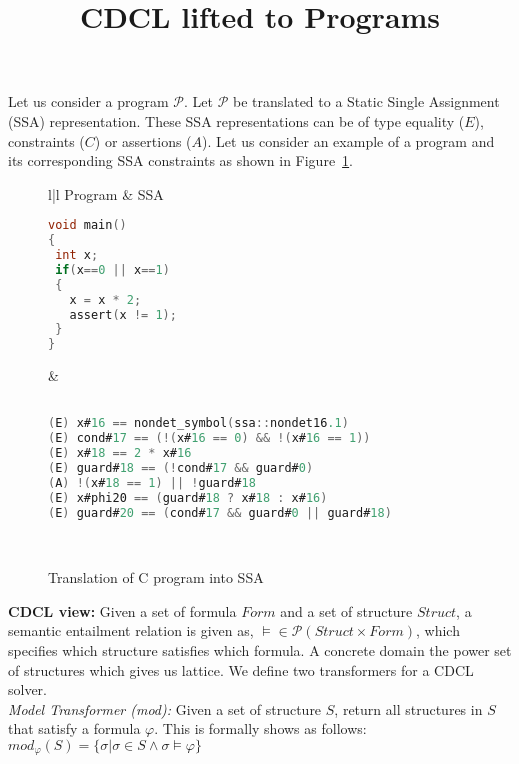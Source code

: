 \documentclass{article}
\begin{document}
\title{CDCL lifted to Programs}
\vspace{0.3cm}
\date{}
\maketitle
{}

\maketitle
Let us consider a program $\mathcal{P}$. Let $\mathcal{P}$ be translated 
to a Static Single Assignment (SSA) representation. These SSA representations 
can be of type equality ($E$), constraints ($C$) or assertions ($A$). 
Let us consider an example of a program and its corresponding SSA constraints as
shown in Figure~\ref{figure:ssa}. 

\begin{figure}[htbp]
\begin{tabular}{l|l}
\hline
Program & SSA \\
\hline
\begin{lstlisting}[mathescape=true,language=C]
void main()
{
 int x;
 if(x==0 || x==1)
 {
   x = x * 2; 
   assert(x != 1);
 }
}
\end{lstlisting}
&
\begin{lstlisting}[mathescape=true,language=C]

(E) x#16 == nondet_symbol(ssa::nondet16.1)
(E) cond#17 == (!(x#16 == 0) && !(x#16 == 1))
(E) x#18 == 2 * x#16
(E) guard#18 == (!cond#17 && guard#0)
(A) !(x#18 == 1) || !guard#18
(E) x#phi20 == (guard#18 ? x#18 : x#16)
(E) guard#20 == (cond#17 && guard#0 || guard#18)
\end{lstlisting}
\\
\hline
\end{tabular}
\caption{Translation of C program into SSA}
\label{figure:ssa}
\end{figure}

\textbf{CDCL view:}
Given a set of formula $Form$ and a set of structure $Struct$, 
a semantic entailment relation is given as, $\models \in \mathcal{P}(Struct
\times Form)$, which specifies which structure satisfies which formula. A 
concrete domain the power set of structures which gives us lattice. 
We define two transformers for a CDCL solver. \\
\textit{Model Transformer (mod):} Given a set of structure $S$, return all structures 
in $S$ that satisfy a formula $\varphi$. This is formally shows as follows:\\
$mod_{\varphi}(S) = \{\sigma | \sigma \in S \wedge \sigma \models \varphi\}$ \\
\end{document}
